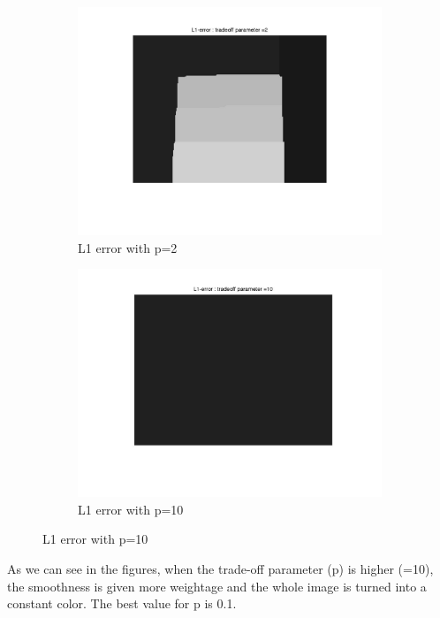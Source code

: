 \documentclass[fleqn]{article}
\begin{document}
\begin{figure}
\begin{subfigure}{0.5\textwidth}
\includegraphics[scale=0.2]{./pics/map_L1_error_p=2.jpg}
\caption{L1 error with p=2}
\end{subfigure}
 \begin{subfigure}{0.5\textwidth}
\includegraphics[scale=0.2]{./pics/map_L1_error_p=10.jpg}
\caption{L1 error with p=10}
\end{subfigure}
\end{figure}
As we can see in the figures, when the trade-off parameter (p) is higher (=10), 
the smoothness is given more weightage and the whole image is turned into a constant color.
The best value for p is 0.1.
\end{document}
